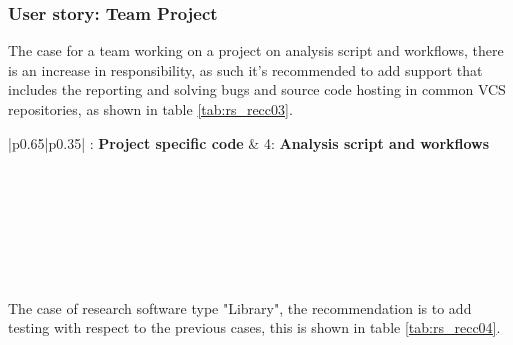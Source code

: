 \subsubsection{User story: Team Project}

The case for a team working on a project on analysis script and workflows, there is an increase in responsibility, as such it's recommended to add support that includes the reporting and solving bugs and source code hosting in common VCS repositories, as shown in table \ref{tab:rs_recc03}.

\begin{center}
    \tabletail{\hline}
    \label{tab:rs_recc03}
    \small
    \begin{supertabular}{|p{0.65\linewidth}|p{0.35\linewidth}|} : \textbf{Project specific code} &
    4: \textbf{Analysis script and workflows} \\ \hline \hline

     \\ \hline
     \\ \hline
     \\ \hline
     \\ \hline
     \\ \hline
     \\ \hline

\end{supertabular}
\end{center}

The case of research software type "Library", the recommendation is to add testing with respect to the previous cases, this is shown in table \ref{tab:rs_recc04}.

